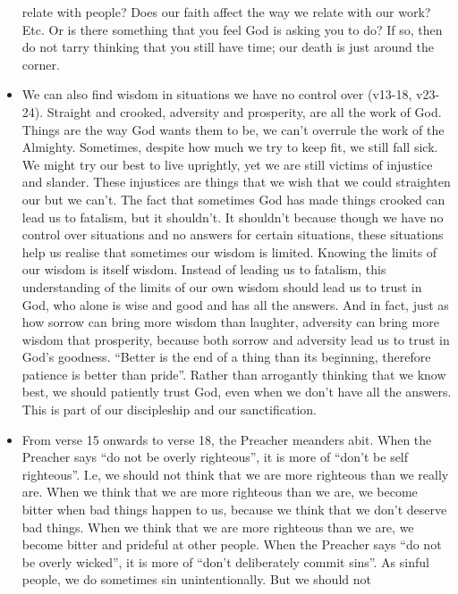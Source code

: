 \begin{itemize}
{  relate with people?  Does our faith affect the way we relate with our work?
  Etc.  Or is there something that you feel God is asking you to do?  If so,
  then do not tarry thinking that you still have time; our death is just
  around the corner.}
  \item{We can also find wisdom in situations we have no control over
  (v13-18, v23-24).  Straight and crooked, adversity and prosperity, are all
  the work of God.  Things are the way God wants them to be, we can't
  overrule the work of the Almighty.
  Sometimes, despite how much we try to keep fit, we still fall sick.  We
  might try our best to live uprightly, yet we are still victims of injustice
  and slander.  These injustices are things that we wish that we could
  straighten our but we can't.  The fact that sometimes God has made things
  crooked can lead us to fatalism, but it shouldn't.  It shouldn't because
  though we have no control over situations and no answers for certain
  situations, these situations help us realise that sometimes our wisdom is
  limited.  Knowing the limits of our wisdom is itself wisdom.  Instead of
  leading us to fatalism, this understanding of the limits of our own wisdom
  should lead us to trust in God, who alone is wise and good and has all the
  answers.  And in fact, just as how sorrow can bring more wisdom than
  laughter, adversity can bring more wisdom that prosperity, because both
  sorrow and adversity lead us to trust in God's goodness.  ``Better is the
  end of a thing than its beginning, therefore patience is better than
  pride''.  Rather than arrogantly thinking that we know best, we should
  patiently trust God, even when we don't have all the answers.  This is part
  of our discipleship and our sanctification.}
  \item{From verse 15 onwards to verse 18, the Preacher meanders abit.  When
  the Preacher says ``do not be overly righteous'', it is more of ``don't be
  self righteous''.  I.e, we should not think that we are more righteous than
  we really are.  When we think that we are more righteous than we are, we
  become bitter when bad things happen to us, because we think that we don't
  deserve bad things.  When we think that we are more righteous than we are,
  we become bitter and prideful at other people.  When the Preacher says ``do
  not be overly wicked'', it is more of ``don't deliberately commit sins''.
  As sinful people, we do sometimes sin unintentionally.  But we should not
}
\end{itemize}
